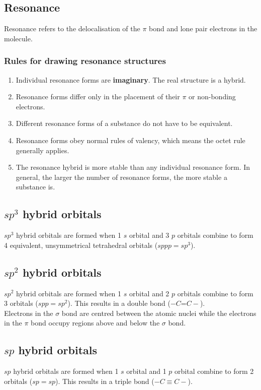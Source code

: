 \documentclass[11pt]{article}
\begin{document}
\subsection{Resonance}
\label{sec:org71c71aa}
Resonance refers to the delocalisation of the \(\pi\) bond and lone pair electrons in the molecule.

\subsubsection{Rules for drawing resonance structures}
\label{sec:org9866ec7}
\begin{enumerate}
\item Individual resonance forms are \textbf{imaginary}. The real structure is a hybrid.
\item Resonance forms differ only in the placement of their \(\pi\) or non-bonding electrons.
\item Different resonance forms of a substance do not have to be equivalent.
\item Resonance forms obey normal rules of valency, which means the octet rule generally applies.
\item The resonance hybrid is more stable than any individual resonance form. In general, the larger the number of resonance forms, the more stable a substance is.
\end{enumerate}

\subsection{\(sp^3\) hybrid orbitals}
\label{sec:org6e4b913}
\(sp^3\) hybrid orbitals are formed when 1 \(s\) orbital and 3 \(p\) orbitals combine to form 4 equivalent, unsymmetrical tetrahedral orbitals (\(sppp = sp^3\)).

\subsection{\(sp^2\) hybrid orbitals}
\label{sec:orgfb39a1e}
\(sp^2\) hybrid orbitals are formed when 1 \(s\) orbital and 2 \(p\) orbitals combine to form 3 orbitals (\(spp = sp^2\)). This results in a double bond (\(- C\)=\(C -\)).
\\[0pt]

Electrons in the \(\sigma\) bond are centred between the atomic nuclei while the electrons in the \(\pi\) bond occupy regions above and below the \(\sigma\) bond.

\subsection{\(sp\) hybrid orbitals}
\label{sec:orge2deb18}
\(sp\) hybrid orbitals are formed when 1 \(s\) orbital and 1 \(p\) orbital combine to form 2 orbitals (\(sp = sp\)). This results in a triple bond (\(- C \equiv C -\)).
\end{document}
